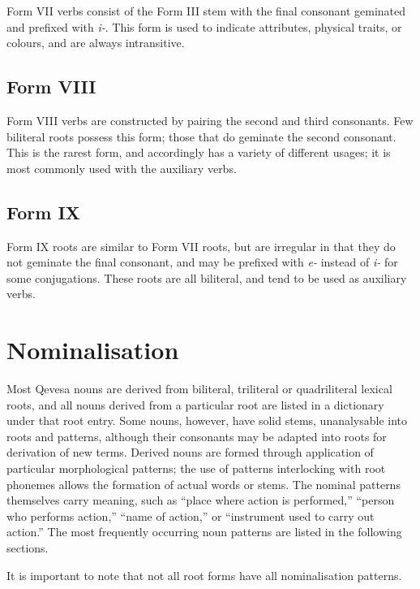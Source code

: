 \documentclass[grammar]{subfiles}
\begin{document}
	Form VII verbs consist of the Form III stem with the final consonant geminated and prefixed with \emph{i-}. This form is used to indicate attributes, physical traits, or colours, and are always intransitive.

	\subsection{Form VIII}
	\label{sec:dev_verb_form_viii}

	Form VIII verbs are constructed by pairing the second and third consonants. Few biliteral roots possess this form; those that do geminate the second consonant. This is the rarest form, and accordingly has a variety of different usages; it is most commonly used with the auxiliary verbs.

	\subsection{Form IX}
	\label{sec:dev_verb_form_ix}

	Form IX roots are similar to Form VII roots, but are irregular in that they do not geminate the final consonant, and may be prefixed with \emph{e-} instead of \emph{i-} for some conjugations. These roots are all biliteral, and tend to be used as auxiliary verbs.

	\section{Nominalisation}
	\label{sec:dev_nominalisation}

	Most Qevesa nouns are derived from biliteral, triliteral or quadriliteral lexical roots, and all nouns derived from a particular root are listed in a dictionary under that root entry. Some nouns, however, have solid stems, unanalysable into roots and patterns, although their consonants may be adapted into roots for derivation of new terms. Derived nouns are formed through application of particular morphological patterns; the use of patterns interlocking with root phonemes allows the formation of actual words or stems. The nominal patterns themselves carry meaning, such as “place where action is performed,” “person who performs action,” “name of action,” or “instrument used to carry out action.” The most frequently occurring noun patterns are listed in the following sections.

	It is important to note that not all root forms have all nominalisation patterns.
\end{document}
